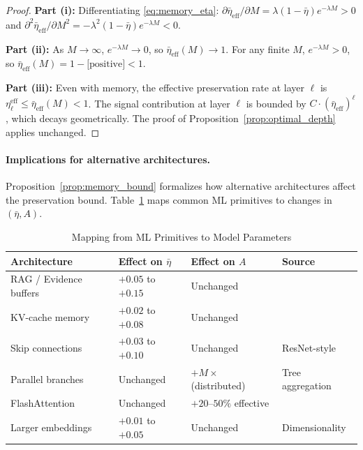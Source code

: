 \begin{proof}
\textbf{Part (i):} Differentiating \eqref{eq:memory_eta}: $\partial \bar{\eta}_{\text{eff}} / \partial M = \lambda (1 - \bar{\eta}) e^{-\lambda M} > 0$ and $\partial^2 \bar{\eta}_{\text{eff}} / \partial M^2 = -\lambda^2 (1 - \bar{\eta}) e^{-\lambda M} < 0$.

\textbf{Part (ii):} As $M \to \infty$, $e^{-\lambda M} \to 0$, so $\bar{\eta}_{\text{eff}}(M) \to 1$. For any finite $M$, $e^{-\lambda M} > 0$, so $\bar{\eta}_{\text{eff}}(M) = 1 - \text{[positive]} < 1$.

\textbf{Part (iii):} Even with memory, the effective preservation rate at layer $\ell$ is $\eta^{\text{eff}}_\ell \leq \bar{\eta}_{\text{eff}}(M) < 1$. The signal contribution at layer $\ell$ is bounded by $C \cdot (\bar{\eta}_{\text{eff}})^{\ell}$, which decays geometrically. The proof of Proposition~\ref{prop:optimal_depth} applies unchanged.
\end{proof}

\paragraph{Implications for alternative architectures.} Proposition~\ref{prop:memory_bound} formalizes how alternative architectures affect the preservation bound. Table~\ref{tab:architecture_mapping} maps common ML primitives to changes in $(\bar{\eta}, A)$.

\begin{table}[htbp]
\centering
\small
\caption{Mapping from ML Primitives to Model Parameters}
\label{tab:architecture_mapping}
\begin{tabular}{@{}>{\raggedright\arraybackslash}p{3.5cm}>{\raggedright\arraybackslash}p{3.5cm}>{\raggedright\arraybackslash}p{3.5cm}>{\raggedright\arraybackslash}p{3.5cm}@{}}
\toprule
\textbf{Architecture} & \textbf{Effect on $\bar{\eta}$} & \textbf{Effect on $A$} & \textbf{Source} \\
\midrule
RAG / Evidence buffers & $+0.05$ to $+0.15$ & Unchanged & \cite{lewis2020retrieval} \\
KV-cache memory & $+0.02$ to $+0.08$ & Unchanged & \cite{pope2023efficiently} \\
Skip connections & $+0.03$ to $+0.10$ & Unchanged & ResNet-style \\
Parallel branches & Unchanged & $+M\times$ (distributed) & Tree aggregation \\
FlashAttention & Unchanged & $+20$--$50\%$ effective & \cite{dao2022flashattention} \\
Larger embeddings & $+0.01$ to $+0.05$ & Unchanged & Dimensionality \\
\bottomrule
\end{tabular}
\end{table}

